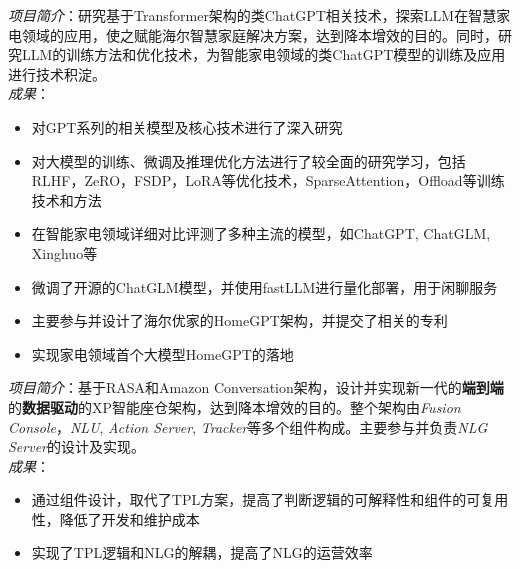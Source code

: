 \documentclass{resume}
\begin{document}

\begin{onehalfspacing}
\emph{项目简介}：研究基于Transformer架构的类ChatGPT相关技术，探索LLM在智慧家电领域的应用，使之赋能海尔智慧家庭解决方案，达到降本增效的目的。同时，研究LLM的训练方法和优化技术，为智能家电领域的类ChatGPT模型的训练及应用进行技术积淀。
\\
\emph{成果}：
\begin{itemize}
  \item 对GPT系列的相关模型及核心技术进行了深入研究
  \item 对大模型的训练、微调及推理优化方法进行了较全面的研究学习，包括RLHF，ZeRO，FSDP，LoRA等优化技术，SparseAttention，Offload等训练技术和方法
  \item 在智能家电领域详细对比评测了多种主流的模型，如ChatGPT, ChatGLM, Xinghuo等
  \item 微调了开源的ChatGLM模型，并使用fastLLM进行量化部署，用于闲聊服务
  \item 主要参与并设计了海尔优家的HomeGPT架构，并提交了相关的专利
  \item 实现家电领域首个大模型HomeGPT的落地
\end{itemize}
\end{onehalfspacing}


\begin{onehalfspacing}
\emph{项目简介}：基于RASA和Amazon Conversation架构，设计并实现新一代的\textbf{端到端}的\textbf{数据驱动}的XP智能座仓架构，达到降本增效的目的。整个架构由{\it Fusion Console}，{\it NLU}, {\it Action Server}, {\it Tracker}等多个组件构成。主要参与并负责{\it NLG Server}的设计及实现。
\\
\emph{成果}：
\begin{itemize}
  \item 通过组件设计，取代了TPL方案，提高了判断逻辑的可解释性和组件的可复用性，降低了开发和维护成本
  \item 实现了TPL逻辑和NLG的解耦，提高了NLG的运营效率
\end{itemize}
\end{onehalfspacing}
\end{document}

